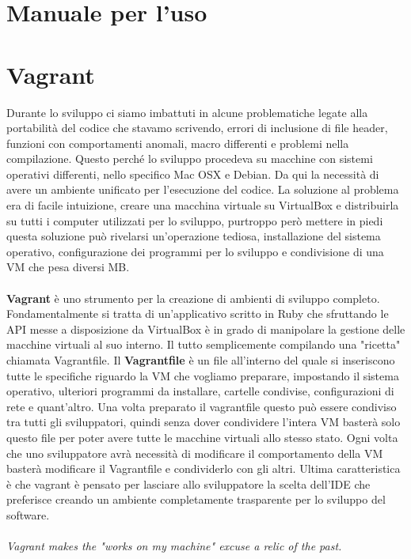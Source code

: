 \documentclass[italian]{tktltiki2}
\begin{document}
\newpage
\appendix
\newpage
\section{Manuale per l'uso}
\newpage
\section{Vagrant}

Durante lo sviluppo ci siamo imbattuti in alcune problematiche
legate alla portabilità del codice che stavamo scrivendo, errori di inclusione di file header, funzioni con comportamenti anomali, macro differenti e problemi nella compilazione. Questo perché lo sviluppo procedeva su macchine con sistemi operativi differenti, nello specifico Mac OSX e Debian. Da qui la necessità di avere un ambiente unificato per l'esecuzione del codice. La soluzione al problema era di facile intuizione, creare una macchina virtuale su VirtualBox e distribuirla su tutti i computer utilizzati per lo sviluppo, purtroppo però mettere in piedi questa soluzione può rivelarsi un'operazione tediosa, installazione del sistema operativo, configurazione dei programmi per lo sviluppo e condivisione di una VM che pesa diversi MB.\\\\
\textbf{Vagrant} è uno strumento per la creazione di ambienti di sviluppo completo. Fondamentalmente si tratta di un’applicativo scritto in Ruby che sfruttando le API messe a disposizione da VirtualBox è in grado di manipolare la gestione delle macchine virtuali al suo interno. Il tutto semplicemente compilando una "ricetta" chiamata Vagrantfile. Il \textbf{Vagrantfile} è un file all’interno del quale si inseriscono tutte le specifiche riguardo la VM che vogliamo preparare, impostando il sistema operativo, ulteriori programmi da installare, cartelle condivise, configurazioni di rete e quant'altro. Una volta preparato il vagrantfile questo può essere condiviso tra tutti gli sviluppatori, quindi senza dover condividere l'intera VM basterà solo questo file per poter avere tutte le macchine virtuali allo stesso stato. Ogni volta che uno sviluppatore avrà necessità di modificare il comportamento della VM basterà modificare il Vagrantfile e condividerlo con gli altri. Ultima caratteristica è che vagrant è pensato per lasciare allo sviluppatore la scelta dell'IDE che preferisce creando un ambiente completamente trasparente per lo sviluppo del software.\\\\
\emph{Vagrant makes the "works on my machine" excuse a relic of the past.}
\end{document}
